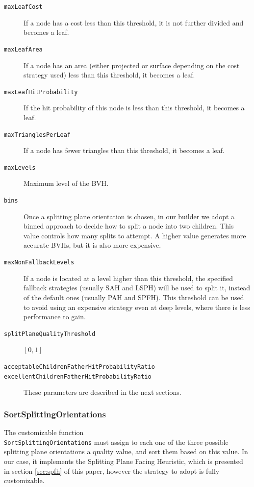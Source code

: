 \documentclass[acmtog, anonymous, review]{acmart}
\begin{document}
\begin{description} 
	\item[\texttt{maxLeafCost}] If a node has a cost less than this threshold, it is not further divided and becomes a leaf.
	\item[\texttt{maxLeafArea}] If a node has an area (either projected or surface depending on the cost strategy used) less than this threshold, it becomes a leaf.
	\item[\texttt{maxLeafHitProbability}] If the hit probability of this node is less than this threshold, it becomes a leaf.
	\item[\texttt{maxTrianglesPerLeaf}] If a node has fewer triangles than this threshold, it becomes a leaf.
	\item[\texttt{maxLevels}] Maximum level of the BVH.
	\item[\texttt{bins}] Once a splitting plane orientation is chosen, in our builder we adopt a binned approach to decide how to split a node into two children. This value controls how many splits to attempt. A higher value generates more accurate BVHs, but it is also more expensive.
	\item[\texttt{maxNonFallbackLevels}] If a node is located at a level higher than this threshold, the specified fallback strategies (usually SAH and LSPH) will be used to split it, instead of the default ones (usually PAH and SPFH). This threshold can be used to avoid using an expensive strategy even at deep levels, where there is less performance to gain.
	\item[\texttt{splitPlaneQualityThreshold}] $[0, 1]$
	\item[\texttt{acceptableChildrenFatherHitProbabilityRatio}]
	\item[\texttt{excellentChildrenFatherHitProbabilityRatio}] These parameters are described in the next sections.
\end{description}

\subsubsection{SortSplittingOrientations}
The customizable function \\\texttt{SortSplittingOrientations} must assign to each one of the three possible splitting plane orientations a quality value, and sort them based on this value. In our case, it implements the Splitting Plane Facing Heuristic, which is presented in section \ref{sec:spfh} of this paper, however the strategy to adopt is fully customizable.
\end{document}
